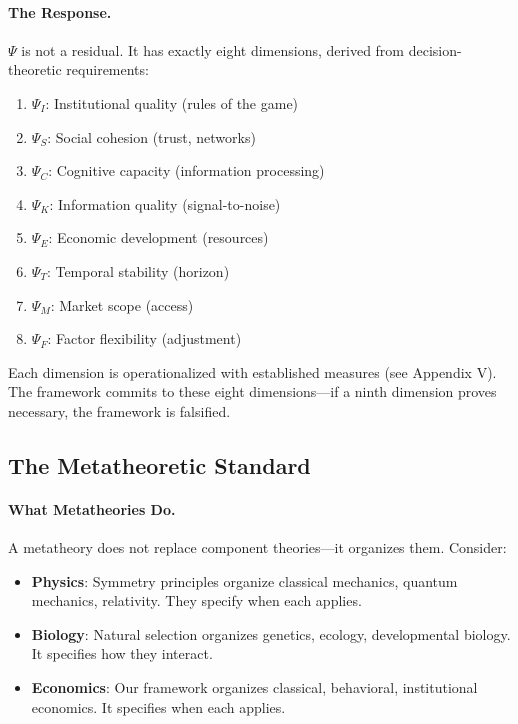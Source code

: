 \paragraph{The Response.}
$\Psi$ is not a residual. It has exactly eight dimensions, derived from decision-theoretic requirements:

\begin{enumerate}
    \item $\Psi_I$: Institutional quality (rules of the game)
    \item $\Psi_S$: Social cohesion (trust, networks)
    \item $\Psi_C$: Cognitive capacity (information processing)
    \item $\Psi_K$: Information quality (signal-to-noise)
    \item $\Psi_E$: Economic development (resources)
    \item $\Psi_T$: Temporal stability (horizon)
    \item $\Psi_M$: Market scope (access)
    \item $\Psi_F$: Factor flexibility (adjustment)
\end{enumerate}

Each dimension is operationalized with established measures (see Appendix V). The framework commits to these eight dimensions---if a ninth dimension proves necessary, the framework is falsified.

\subsection{The Metatheoretic Standard}

\paragraph{What Metatheories Do.}
A metatheory does not replace component theories---it organizes them. Consider:

\begin{itemize}
    \item \textbf{Physics}: Symmetry principles organize classical mechanics, quantum mechanics, relativity. They specify when each applies.
    \item \textbf{Biology}: Natural selection organizes genetics, ecology, developmental biology. It specifies how they interact.
    \item \textbf{Economics}: Our framework organizes classical, behavioral, institutional economics. It specifies when each applies.
\end{itemize}

